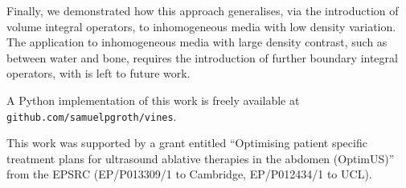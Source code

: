 \documentclass[preprint]{JASA}
\newcommand{\red}[1]{{\color{red} #1}}
\begin{document}
\red{Finally, we demonstrated how this approach generalises, via the introduction of volume integral operators,
 to inhomogeneous media with low density variation.
The application to inhomogeneous media with large density contrast, such as between 
water and bone, requires the introduction of further boundary integral operators, 
with is left to future work.}


A Python implementation of this work is freely available at \verb!github.com/samuelpgroth/vines!.



\begin{acknowledgments}
This work was supported by a grant entitled 
``Optimising patient specific treatment plans for ultrasound ablative therapies in the abdomen (OptimUS)''
from the EPSRC (EP/P013309/1 to Cambridge, EP/P012434/1 to UCL).
\end{acknowledgments}





\end{document}
